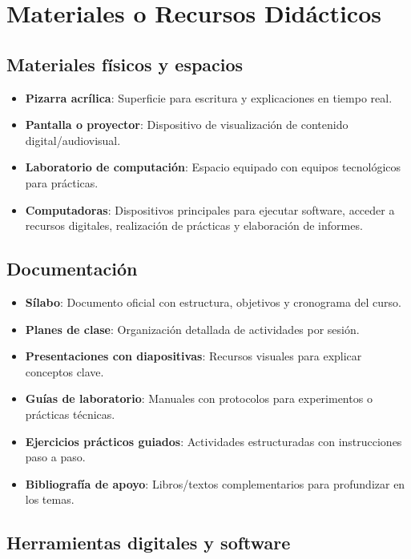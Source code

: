 \section{Materiales o Recursos Didácticos}

\subsection*{Materiales físicos y espacios}

\begin{itemize}
    \item \textbf{Pizarra acrílica}: Superficie para escritura y explicaciones en tiempo real.
    \item \textbf{Pantalla o proyector}: Dispositivo de visualización de contenido digital/audiovisual.
    \item \textbf{Laboratorio de computación}: Espacio equipado con equipos tecnológicos para prácticas.
    \item \textbf{Computadoras}: Dispositivos principales para ejecutar software, acceder a recursos digitales, realización de prácticas y elaboración de informes.
\end{itemize}

\subsection*{Documentación}

\begin{itemize}
    \item \textbf{Sílabo}: Documento oficial con estructura, objetivos y cronograma del curso.
    \item \textbf{Planes de clase}: Organización detallada de actividades por sesión.
    \item \textbf{Presentaciones con diapositivas}: Recursos visuales para explicar conceptos clave.
    \item \textbf{Guías de laboratorio}: Manuales con protocolos para experimentos o prácticas técnicas.
    \item \textbf{Ejercicios prácticos guiados}: Actividades estructuradas con instrucciones paso a paso.
    \item \textbf{Bibliografía de apoyo}: Libros/textos complementarios para profundizar en los temas.
\end{itemize}

\subsection*{Herramientas digitales y software}


